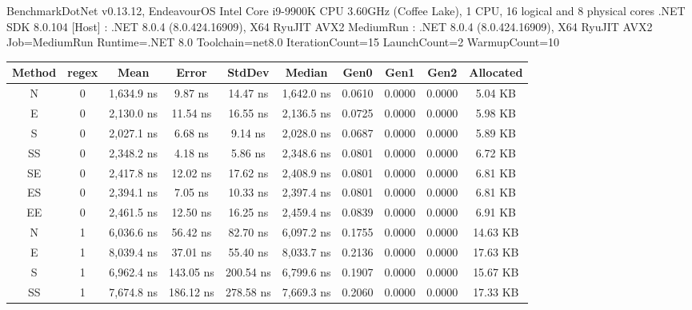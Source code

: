 BenchmarkDotNet v0.13.12, EndeavourOS
Intel Core i9-9900K CPU 3.60GHz (Coffee Lake), 1 CPU, 16 logical and 8 physical cores
.NET SDK 8.0.104
    [Host]    : .NET 8.0.4 (8.0.424.16909), X64 RyuJIT AVX2
MediumRun : .NET 8.0.4 (8.0.424.16909), X64 RyuJIT AVX2
Job=MediumRun  Runtime=.NET 8.0  Toolchain=net8.0
IterationCount=15  LaunchCount=2  WarmupCount=10

\begin{sidewaystable}
    \begin{tabular}{|c|c|c|c|c|c|c|c|c|c|}
        \hline
        Method & regex & Mean            & Error         & StdDev        & Median          & Gen0     & Gen1     & Gen2     & Allocated   \\
        \hline
        N      & 0     & 1,634.9 ns      & 9.87 ns       & 14.47 ns      & 1,642.0 ns      & 0.0610   & 0.0000   & 0.0000   & 5.04 KB     \\
        E      & 0     & 2,130.0 ns      & 11.54 ns      & 16.55 ns      & 2,136.5 ns      & 0.0725   & 0.0000   & 0.0000   & 5.98 KB     \\
        S      & 0     & 2,027.1 ns      & 6.68 ns       & 9.14 ns       & 2,028.0 ns      & 0.0687   & 0.0000   & 0.0000   & 5.89 KB     \\
        SS     & 0     & 2,348.2 ns      & 4.18 ns       & 5.86 ns       & 2,348.6 ns      & 0.0801   & 0.0000   & 0.0000   & 6.72 KB     \\
        SE     & 0     & 2,417.8 ns      & 12.02 ns      & 17.62 ns      & 2,408.9 ns      & 0.0801   & 0.0000   & 0.0000   & 6.81 KB     \\
        ES     & 0     & 2,394.1 ns      & 7.05 ns       & 10.33 ns      & 2,397.4 ns      & 0.0801   & 0.0000   & 0.0000   & 6.81 KB     \\
        EE     & 0     & 2,461.5 ns      & 12.50 ns      & 16.25 ns      & 2,459.4 ns      & 0.0839   & 0.0000   & 0.0000   & 6.91 KB     \\
        N      & 1     & 6,036.6 ns      & 56.42 ns      & 82.70 ns      & 6,097.2 ns      & 0.1755   & 0.0000   & 0.0000   & 14.63 KB    \\
        E      & 1     & 8,039.4 ns      & 37.01 ns      & 55.40 ns      & 8,033.7 ns      & 0.2136   & 0.0000   & 0.0000   & 17.63 KB    \\
        S      & 1     & 6,962.4 ns      & 143.05 ns     & 200.54 ns     & 6,799.6 ns      & 0.1907   & 0.0000   & 0.0000   & 15.67 KB    \\
        SS     & 1     & 7,674.8 ns      & 186.12 ns     & 278.58 ns     & 7,669.3 ns      & 0.2060   & 0.0000   & 0.0000   & 17.33 KB    \\

\end{tabular}
\end{sidewaystable}
